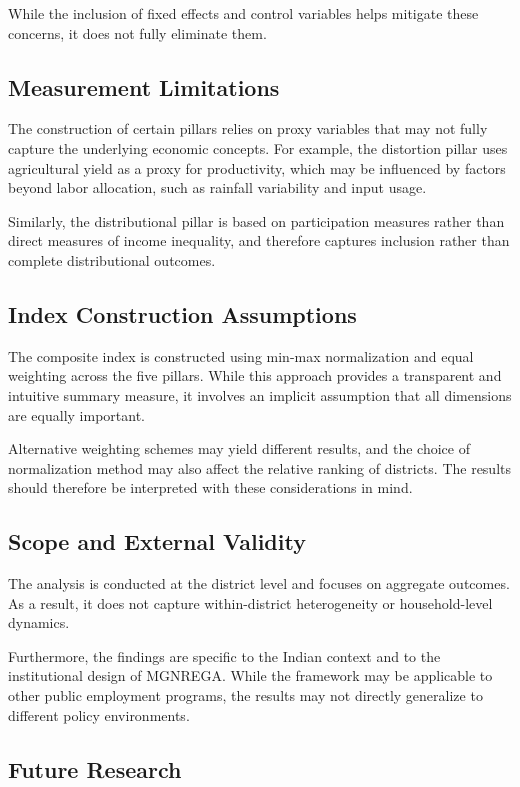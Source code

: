 \documentclass[12pt]{article}
\begin{document}
While the inclusion of fixed effects and control variables helps mitigate these concerns, it does not fully eliminate them.

\subsection{Measurement Limitations}

The construction of certain pillars relies on proxy variables that may not fully capture the underlying economic concepts. For example, the distortion pillar uses agricultural yield as a proxy for productivity, which may be influenced by factors beyond labor allocation, such as rainfall variability and input usage.

Similarly, the distributional pillar is based on participation measures rather than direct measures of income inequality, and therefore captures inclusion rather than complete distributional outcomes.

\subsection{Index Construction Assumptions}

The composite index is constructed using min-max normalization and equal weighting across the five pillars. While this approach provides a transparent and intuitive summary measure, it involves an implicit assumption that all dimensions are equally important.

Alternative weighting schemes may yield different results, and the choice of normalization method may also affect the relative ranking of districts. The results should therefore be interpreted with these considerations in mind.

\subsection{Scope and External Validity}

The analysis is conducted at the district level and focuses on aggregate outcomes. As a result, it does not capture within-district heterogeneity or household-level dynamics.

Furthermore, the findings are specific to the Indian context and to the institutional design of MGNREGA. While the framework may be applicable to other public employment programs, the results may not directly generalize to different policy environments.

\subsection{Future Research}
\end{document}

